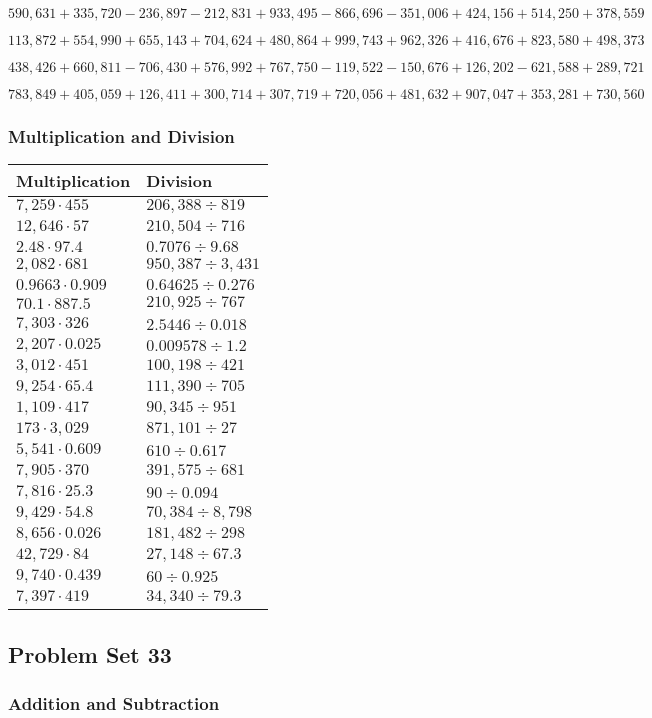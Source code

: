 \(590,631+335,720-236,897-212,831+933,495-866,696-351,006+424,156+514,250+378,559\)

\(113,872+554,990+655,143+704,624+480,864+999,743+962,326+416,676+823,580+498,373\)

\(438,426+660,811-706,430+576,992+767,750-119,522-150,676+126,202-621,588+289,721\)

\(783,849+405,059+126,411+300,714+307,719+720,056+481,632+907,047+353,281+730,560\)

\hypertarget{multiplication-and-division-336}{%
\subsubsection{Multiplication and
Division}\label{multiplication-and-division-336}}

\begin{longtable}[]{@{}ll@{}}
\toprule
Multiplication & Division\tabularnewline
\midrule
\endhead
\(7,259\cdot455\) & \(206,388÷819\)\tabularnewline
\(12,646\cdot57\) & \(210,504÷716\)\tabularnewline
\(2.48\cdot97.4\) & \(0.7076÷9.68\)\tabularnewline
\(2,082\cdot681\) & \(950,387÷3,431\)\tabularnewline
\(0.9663\cdot0.909\) & \(0.64625÷0.276\)\tabularnewline
\(70.1\cdot887.5\) & \(210,925÷767\)\tabularnewline
\(7,303\cdot326\) & \(2.5446÷0.018\)\tabularnewline
\(2,207\cdot0.025\) & \(0.009578÷1.2\)\tabularnewline
\(3,012\cdot451\) & \(100,198÷421\)\tabularnewline
\(9,254\cdot65.4\) & \(111,390÷705\)\tabularnewline
\(1,109\cdot417\) & \(90,345÷951\)\tabularnewline
\(173\cdot3,029\) & \(871,101÷27\)\tabularnewline
\(5,541\cdot0.609\) & \(610÷0.617\)\tabularnewline
\(7,905\cdot370\) & \(391,575÷681\)\tabularnewline
\(7,816\cdot25.3\) & \(90÷0.094\)\tabularnewline
\(9,429\cdot54.8\) & \(70,384÷8,798\)\tabularnewline
\(8,656\cdot0.026\) & \(181,482÷298\)\tabularnewline
\(42,729\cdot84\) & \(27,148÷67.3\)\tabularnewline
\(9,740\cdot0.439\) & \(60÷0.925\)\tabularnewline
\(7,397\cdot419\) & \(34,340÷79.3\)\tabularnewline
\bottomrule
\end{longtable}

\hypertarget{problem-set-33-5}{%
\subsection{Problem Set 33}\label{problem-set-33-5}}

\hypertarget{addition-and-subtraction-338}{%
\subsubsection{Addition and
Subtraction}\label{addition-and-subtraction-338}}

